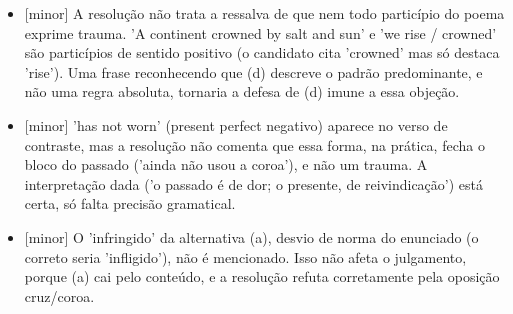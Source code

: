 \documentclass{article}%
\begin{document}
\begin{itemize}%
\item%
{[}minor{]} A resolução não trata a ressalva de que nem todo particípio do poema exprime trauma. 'A continent crowned by salt and sun' e 'we rise / crowned' são particípios de sentido positivo (o candidato cita 'crowned' mas só destaca 'rise'). Uma frase reconhecendo que (d) descreve o padrão predominante, e não uma regra absoluta, tornaria a defesa de (d) imune a essa objeção.%
\item%
{[}minor{]} 'has not worn' (present perfect negativo) aparece no verso de contraste, mas a resolução não comenta que essa forma, na prática, fecha o bloco do passado ('ainda não usou a coroa'), e não um trauma. A interpretação dada ('o passado é de dor; o presente, de reivindicação') está certa, só falta precisão gramatical.%
\item%
{[}minor{]} O 'infringido' da alternativa (a), desvio de norma do enunciado (o correto seria 'infligido'), não é mencionado. Isso não afeta o julgamento, porque (a) cai pelo conteúdo, e a resolução refuta corretamente pela oposição cruz/coroa.%
\end{itemize}%
\end{document}
